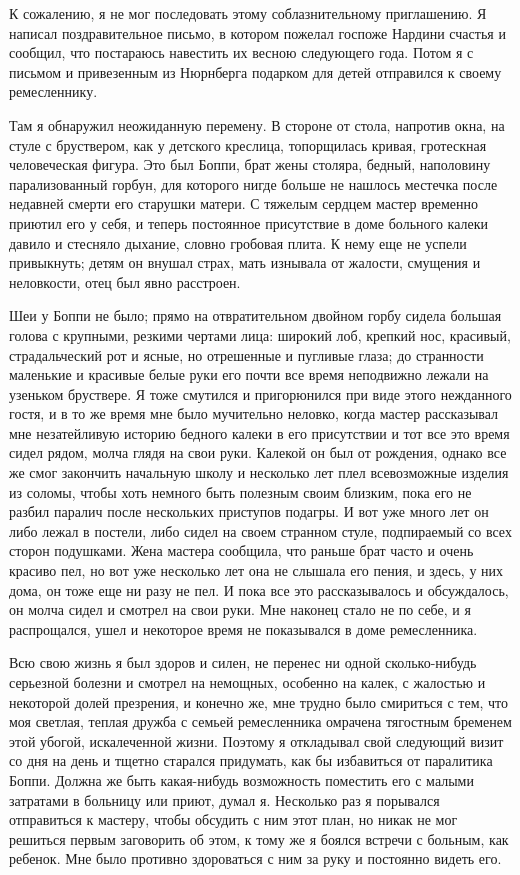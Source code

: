 К сожалению, я не  мог последовать этому соблазнительному приглашению.
Я написал  поздравительное письмо,  в котором пожелал  госпоже Нардини
счастья и сообщил, что постараюсь навестить их весною следующего года.
Потом  я с  письмом  и  привезенным из  Нюрнберга  подарком для  детей
отправился к своему ремесленнику.

Там я  обнаружил неожиданную  перемену. В  стороне от  стола, напротив
окна,  на стуле  с бруствером,  как у  детского креслица,  топорщилась
кривая,  гротескная  человеческая фигура.  Это  был  Боппи, брат  жены
столяра, бедный, наполовину парализованный  горбун, для которого нигде
больше не нашлось местечка после  недавней смерти его старушки матери.
С  тяжелым  сердцем мастер  временно  приютил  его  у себя,  и  теперь
постоянное  присутствие  в  доме  больного калеки  давило  и  стесняло
дыхание, словно гробовая плита. К нему еще не успели привыкнуть; детям
он внушал страх, мать изнывала от жалости, смущения и неловкости, отец
был явно расстроен.

Шеи  у Боппи  не было;  прямо на  отвратительном двойном  горбу сидела
большая голова с крупными, резкими  чертами лица: широкий лоб, крепкий
нос, красивый,  страдальческий рот и  ясные, но отрешенные  и пугливые
глаза; до  странности маленькие  и красивые белые  руки его  почти все
время  неподвижно лежали  на  узеньком бруствере.  Я  тоже смутился  и
пригорюнился при виде этого нежданного гостя, и в то же время мне было
мучительно неловко, когда мастер  рассказывал мне незатейливую историю
бедного калеки  в его  присутствии и  тот все  это время  сидел рядом,
молча глядя  на свои руки. Калекой  он был от рождения,  однако все же
смог  закончить  начальную школу  и  несколько  лет плел  всевозможные
изделия из  соломы, чтобы  хоть немного  быть полезным  своим близким,
пока его не  разбил паралич после нескольких приступов  подагры. И вот
уже много  лет он либо лежал  в постели, либо сидел  на своем странном
стуле, подпираемый  со всех  сторон подушками. Жена  мастера сообщила,
что раньше  брат часто и очень  красиво пел, но вот  уже несколько лет
она не слышала его пения, и здесь, у  них дома, он тоже еще ни разу не
пел. И  пока все это  рассказывалось и  обсуждалось, он молча  сидел и
смотрел на свои  руки. Мне наконец стало не по  себе, и я распрощался,
ушел и некоторое время не показывался в доме ремесленника.

Всю  свою   жизнь  я  был  здоров   и  силен,  не  перенес   ни  одной
сколько-нибудь серьезной  болезни и  смотрел на немощных,  особенно на
калек,  с жалостью  и некоторой  долей  презрения, и  конечно же,  мне
трудно было смириться  с тем, что моя светлая, теплая  дружба с семьей
ремесленника  омрачена тягостным  бременем  этой убогой,  искалеченной
жизни. Поэтому  я откладывал  свой следующий  визит со  дня на  день и
тщетно  старался придумать,  как  бы избавиться  от паралитика  Боппи.
Должна  же  быть  какая-нибудь  возможность  поместить  его  с  малыми
затратами в  больницу или  приют, думал я.  Несколько раз  я порывался
отправиться к мастеру, чтобы обсудить с ним этот план, но никак не мог
решиться  первым заговорить  об этом,  к тому  же я  боялся встречи  с
больным, как  ребенок. Мне было противно  здороваться с ним за  руку и
постоянно видеть его.

